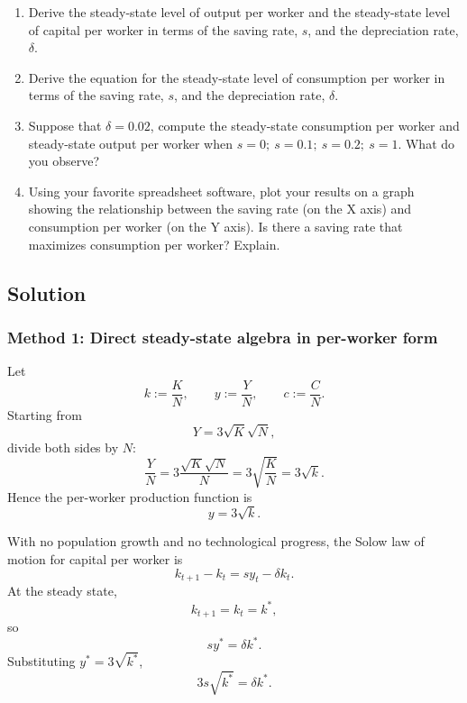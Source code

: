 \documentclass[12pt]{article}
\begin{document}
\begin{enumerate}[label=(\alph*)]
    \item Derive the steady-state level of output per worker and the steady-state level of capital per worker in terms of the saving rate, \(s\), and the depreciation rate, \(\delta\).
    \item Derive the equation for the steady-state level of consumption per worker in terms of the saving rate, \(s\), and the depreciation rate, \(\delta\).
    \item Suppose that \(\delta = 0.02\), compute the steady-state consumption per worker and steady-state output per worker when \(s = 0;\ s = 0.1;\ s = 0.2;\ s = 1\). What do you observe?
    \item Using your favorite spreadsheet software, plot your results on a graph showing the relationship between the saving rate (on the X axis) and consumption per worker (on the Y axis). Is there a saving rate that maximizes consumption per worker? Explain.
\end{enumerate}

\newpage
\subsection{Solution}

\subsubsection{Method 1: Direct steady-state algebra in per-worker form}
Let
\[
k:=\frac{K}{N},
\qquad
y:=\frac{Y}{N},
\qquad
c:=\frac{C}{N}.
\]
Starting from
\[
Y=3\sqrt{K}\sqrt{N},
\]
divide both sides by \(N\):
\[
\frac{Y}{N}=3\frac{\sqrt{K}\sqrt{N}}{N}
=3\sqrt{\frac{K}{N}}
=3\sqrt{k}.
\]
Hence the per-worker production function is
\[
y=3\sqrt{k}.
\]

With no population growth and no technological progress, the Solow law of motion for capital per worker is
\[
k_{t+1}-k_t=s y_t-\delta k_t.
\]
At the steady state,
\[
k_{t+1}=k_t=k^*,
\]
so
\[
s y^*=\delta k^*.
\]
Substituting \(y^*=3\sqrt{k^*}\),
\[
3s\sqrt{k^*}=\delta k^*.
\]
\end{document}
